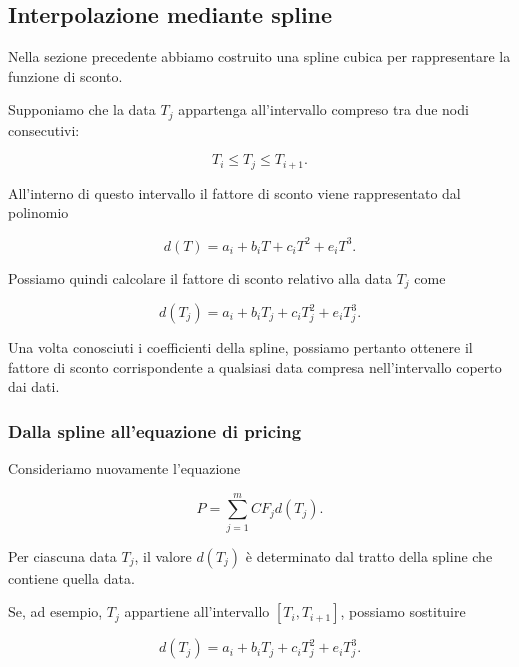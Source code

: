 \subsection{Interpolazione mediante spline}

Nella sezione precedente abbiamo costruito una spline cubica per
rappresentare la funzione di sconto.

Supponiamo che la data $T_j$ appartenga all'intervallo compreso tra
due nodi consecutivi:

\begin{equation*}
    T_i\leq T_j\leq T_{i+1}.
\end{equation*}

All'interno di questo intervallo il fattore di sconto viene
rappresentato dal polinomio

\begin{equation*}
    d(T)
    =
    a_i+b_iT+c_iT^2+e_iT^3.
    \label{eq:discount-spline-segment}
\end{equation*}

Possiamo quindi calcolare il fattore di sconto relativo alla data
$T_j$ come

\begin{equation*}
    d(T_j)
    =
    a_i+b_iT_j+c_iT_j^2+e_iT_j^3.
    \label{eq:discount-at-cashflow}
\end{equation*}

Una volta conosciuti i coefficienti della spline, possiamo pertanto
ottenere il fattore di sconto corrispondente a qualsiasi data
compresa nell'intervallo coperto dai dati.


\subsubsection{Dalla spline all'equazione di pricing}

Consideriamo nuovamente l'equazione

\begin{equation*}
    P
    =
    \sum_{j=1}^{m}
    CF_jd(T_j).
\end{equation*}

Per ciascuna data $T_j$, il valore $d(T_j)$ è determinato dal tratto
della spline che contiene quella data.

Se, ad esempio, $T_j$ appartiene all'intervallo
$[T_i,T_{i+1}]$, possiamo sostituire

\begin{equation*}
    d(T_j)
    =
    a_i+b_iT_j+c_iT_j^2+e_iT_j^3.
\end{equation*}


